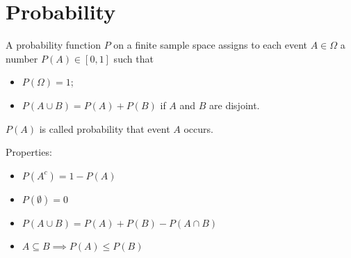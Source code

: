 \section*{Probability}
{
    A probability function $P$ on a finite sample space assigns to each event $A \in \Omega$ a number $P(A) \in [0,1]$ such that
    \begin{itemize}
        \item $P(\Omega) = 1$;
        \item $P(A \cup B) = P(A) + P(B)$ if $A$ and $B$ are disjoint.
    \end{itemize}
    $P(A)$ is called probability that event $A$ occurs.
}
Properties:
\begin{itemize}[itemsep=1pt]
    \item $P(A^c) = 1 - P(A)$
    \item $P(\emptyset) = 0$
    \item $P(A \cup B) = P(A) + P(B) - P(A \cap B)$
    \item $A \subseteq B \implies P(A) \leq P(B)$
\end{itemize}

